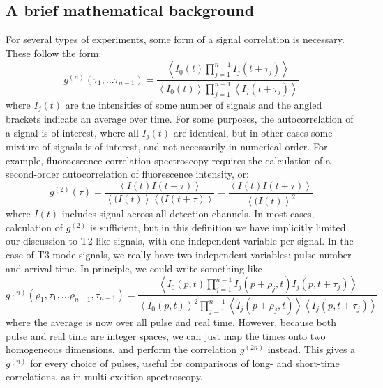 \documentclass{article}
\newcommand{\angles}[1]{\ensuremath{\left\langle #1 \right\rangle}}
\newcommand{\gn}[1]{\ensuremath{g^{(#1)}}}
\begin{document}
\subsection{A brief mathematical background}
\label{sec:correlate_math}
For several types of experiments, some form of a signal correlation is necessary. These follow the form:
\begin{equation}
\label{eq:correlation}
\gn{n}(\tau_{1}, \ldots \tau_{n-1}) = \frac
	{\angles{I_{0}(t)\prod_{j=1}^{n-1}{I_{j}(t+\tau_{j})}}}
	{\angles{I_{0}(t)}\prod_{j=1}^{n-1}{\angles{I_{j}(t+\tau_{j})}}}
\end{equation}
where $I_{j}(t)$ are the intensities of some number of signals and the angled brackets indicate an average over time. For some purposes, the autocorrelation of a signal is of interest, where all $I_{j}(t)$ are identical, but in other cases some mixture of signals is of interest, and not necessarily in numerical order. For example, fluoroescence correlation spectroscopy requires the calculation of a second-order autocorrelation of fluorescence intensity, or:
\begin{equation}
\label{eq:g2}
\gn{2}(\tau) = \frac{\angles{I(t)I(t+\tau)}}
                 {\angles{(I(t)}\angles{(I(t+\tau)}}
             = \frac{\angles{I(t)I(t+\tau)}}
                 {\angles{(I(t)}^{2}}
\end{equation}
where $I(t)$ includes signal across all detection channels. In most cases, calculation of \gn{2} is sufficient, but in this definition we have implicitly limited our discussion to T2-like signals, with one independent variable per signal. In the case of T3-mode signals, we really have two independent variables: pulse number and arrival time. In principle, we could write something like
\begin{equation}
\gn{n}(\rho_{1}, \tau_{1}, \ldots \rho_{n-1}, \tau_{n-1}) = \frac
	{\angles{I_{0}(p, t)\prod_{j=1}^{n-1}{I_{j}(p+\rho_{j},t)I_{j}(p,t+\tau_{j})}}}
	{\angles{I_{0}(p, t)}^{2}\prod_{j=1}^{n-1}{\angles{I_{j}(p+\rho_{j},t)}
	                                       \angles{I_{j}(p,t+\tau_{j})}}}
\end{equation}
where the average is now over all pulse and real time. However, because both pulse and real time are integer spaces, we can just map the times onto two homogeneous dimensions, and perform the correlation \gn{2n} instead. This gives a \gn{n} for every choice of pulses, useful for comparisons of long- and short-time correlations, as in multi-excition spectroscopy.
\end{document}
